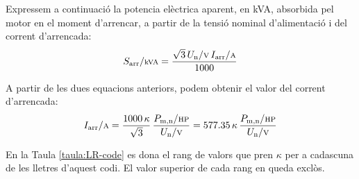 Expressem a continuació la potencia elèctrica aparent, en kVA, absorbida pel motor en el moment d'arrencar, a partir de la tensió nominal d'alimentació i del corrent d'arrencada:
\begin{equation}
    S\ped{arr}/{\scriptstyle \si{kVA}} = \frac{\sqrt{3}\,U\ped{n}/{\scriptstyle \si{V}}\,I\ped{arr}/{\scriptstyle \si{A}}}{1000}
\end{equation}

A partir de les dues equacions anteriors, podem obtenir el valor del corrent d'arrencada:
\begin{equation}
    I\ped{arr}/{\scriptstyle \si{A}} = \frac{1000 \,\kappa}{\sqrt{3}} \,\frac{P\ped{m,n}/{\scriptstyle \si{HP}}}{U\ped{n}/{\scriptstyle \si{V}}} = \num{577,35}\,\kappa\,\frac{P\ped{m,n}/{\scriptstyle \si{HP}}}{U\ped{n}/{\scriptstyle \si{V}}}\label{eq:LR-code}
\end{equation}

En la Taula \vref{taula:LR-code} es dona el rang de valors que pren $\kappa$ per a cadascuna de les lletres d'aquest codi. El valor superior de cada rang en queda exclòs.

